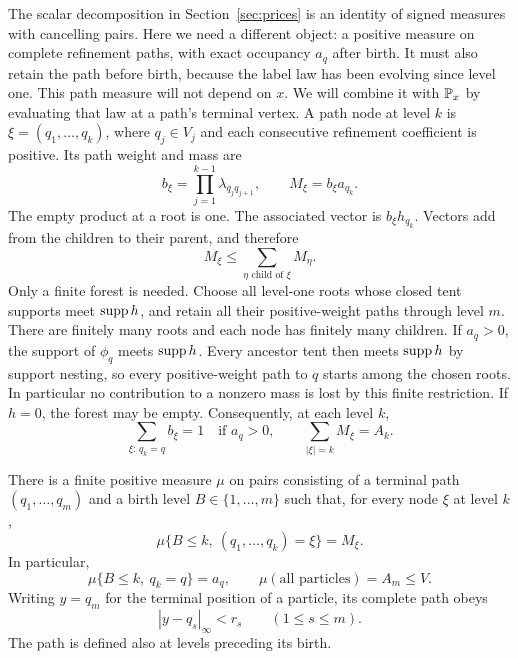 The scalar decomposition in Section~\ref{sec:prices} is an identity
of signed measures with cancelling pairs. Here we need a different
object: a positive measure on complete refinement paths, with exact
occupancy $a_q$ after birth. It must also retain the path before birth,
because the label law has been evolving since level one.
This path measure will not depend on $x$. We will combine it with
$\mathbb P_x$ by evaluating that law at a path's terminal vertex.
A path node at level $k$ is
$\xi=(q_1,\ldots,q_k)$, where $q_j\in V_j$ and each consecutive
refinement coefficient is positive. Its path weight and mass are
\[
 b_\xi=\prod_{j=1}^{k-1}\lambda_{q_jq_{j+1}},
 \qquad M_\xi=b_\xi a_{q_k}.
\]
The empty product at a root is one. The associated vector is
$b_\xi h_{q_k}$. Vectors add from the children to their parent, and therefore
\begin{equation}
 M_\xi\le\sum_{\eta\text{ child of }\xi}M_\eta.
 \label{eq:labels-child-capacity}
\end{equation}
Only a finite forest is needed. Choose all level-one roots whose closed
tent supports meet $\operatorname{supp} h$, and retain all their positive-weight paths
through level $m$. There are finitely many roots and each node has finitely
many children. If $a_q>0$, the support of $\phi_q$ meets $\operatorname{supp} h$.
Every ancestor tent then meets $\operatorname{supp} h$ by support nesting, so every
positive-weight path to $q$ starts among the chosen roots. In
particular no contribution to a nonzero mass is lost by this finite
restriction. If $h=0$, the forest may be empty.
Consequently, at each level $k$,
\begin{equation}
 \sum_{\xi:\,q_k=q}b_\xi=1\quad\text{if }a_q>0,
 \qquad
 \sum_{|\xi|=k}M_\xi=A_k.
 \label{eq:labels-node-column-sums}
\end{equation}

\begin{lemma}
\label{lem:labels-particles}
There is a finite positive measure $\mu$ on pairs consisting of a terminal
path $(q_1,\ldots,q_m)$ and a birth level $B\in\{1,\ldots,m\}$ such that,
for every node $\xi$ at level $k$,
\begin{equation}
 \mu\{B\le k,\ (q_1,\ldots,q_k)=\xi\}=M_\xi.
 \label{eq:labels-node-occupancy}
\end{equation}
In particular,
\begin{equation}
 \mu\{B\le k,\ q_k=q\}=a_q,
 \qquad \mu(\text{all particles})=A_m\le V.
 \label{eq:labels-vertex-occupancy}
\end{equation}
Writing $y=q_m$ for the terminal position of a particle, its complete path
obeys
\begin{equation}
 |y-q_s|_{\infty}<r_s\qquad(1\le s\le m).
 \label{eq:labels-path-locality}
\end{equation}
The path is defined also at levels preceding its birth.
\end{lemma}

